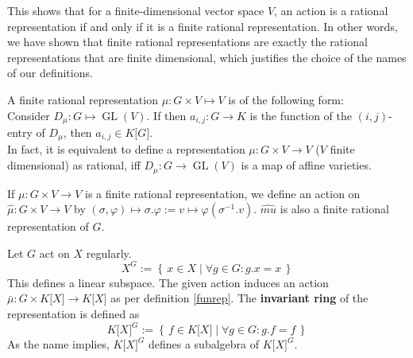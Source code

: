 \begin{remark}
  This shows that for a finite-dimensional vector space $V$, an action is a rational representation if and only if it is a finite rational representation.
  In other words, we have shown that finite rational representations are exactly the rational representations that are finite dimensional, which justifies the choice of the names of our definitions.
\end{remark}

\begin{remark}
  A finite rational representation $\mu \colon G \times V \longmapsto V$ is of the following form:\\
  Consider $D_{\mu} \colon G \longmapsto \operatorname{GL}(V)$.
  If then $ a_{i,j} : G \longrightarrow K $ is the function of the $\left( i,j \right) $-entry of $D_{\mu}$, then $ a_{i,j} \in K\lbrack G\rbrack $.\\
  In fact, it is equivalent to define a representation $\mu \colon G \times V \longrightarrow V$ ($V$ finite dimensional) as rational, iff $D_{\mu} \colon G \longrightarrow \operatorname{GL}(V)$ is a map of affine varieties.
\end{remark}

\begin{definition}
  If $\mu \colon G \times V \longrightarrow V$ is a finite rational representation, we define an action on $\hat{\mu} \colon G \times V \longrightarrow V$ by $(\sigma,\varphi) \mapsto \sigma.\varphi := v \mapsto \varphi(\sigma^{-1}.v)$.
  $\hat{mu}$ is also a finite rational representation of $G$.
\end{definition}

\begin{definition}[Invariants]
  Let $ G $ act on $ X $ regularly.
  \begin{equation}
    X^G := \left\{\, x \in X \mid \forall g \in G : g . x = x \,\right\}
  \end{equation}
  This defines a linear subspace.
  The given action induces an action $ \bar{\mu} \colon G \times K\lbrack X\rbrack \longrightarrow K\lbrack X\rbrack $ as per definition \ref{funrep}.
  The \textbf{invariant ring} of the representation is defined as
  \begin{equation}
    K\lbrack X\rbrack^G := \left\{ \, f \in K\lbrack X \rbrack \mid \forall g \in G : g . f = f \, \right\}
  \end{equation}
  As the name implies, $ K\lbrack X\rbrack^G $ defines a subalgebra of $ K\lbrack X\rbrack^G $.
\end{definition}

